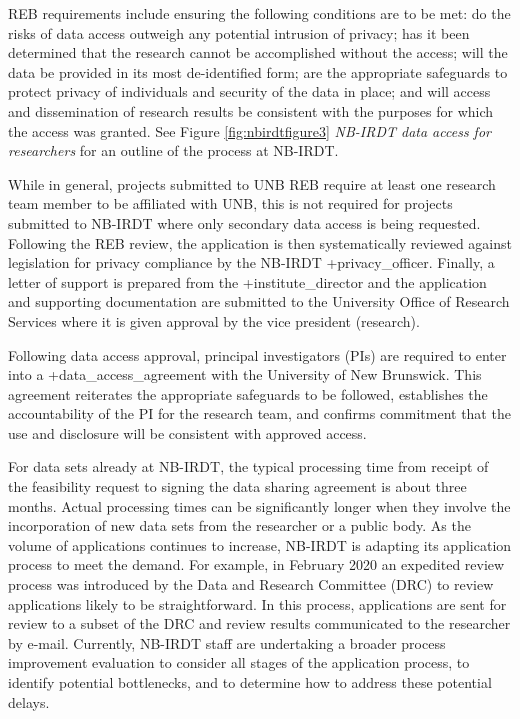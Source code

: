 \documentclass[
]{book}
\begin{document}
REB requirements include ensuring the following conditions are to be met: do the risks of data access outweigh any potential intrusion of privacy; has it been determined that the research cannot be accomplished without the access; will the data be provided in its most de-identified form; are the appropriate safeguards to protect privacy of individuals and security of the data in place; and will access and dissemination of research results be consistent with the purposes for which the access was granted. See Figure \ref{fig:nbirdtfigure3} \emph{NB-IRDT data access for researchers} for an outline of the process at NB-IRDT.

While in general, projects submitted to UNB REB require at least one research team member to be affiliated with UNB, this is not required for projects submitted to NB-IRDT where only secondary data access is being requested. Following the REB review, the application is then systematically reviewed against legislation for privacy compliance by the NB-IRDT +privacy\_officer\textbar. Finally, a letter of support is prepared from the +institute\_director\textbar{} and the application and supporting documentation are submitted to the University Office of Research Services where it is given approval by the vice president (research).

Following data access approval, principal investigators (PIs) are required to enter into a +data\_access\_agreement\textbar{} with the University of New Brunswick. This agreement reiterates the appropriate safeguards to be followed, establishes the accountability of the PI for the research team, and confirms commitment that the use and disclosure will be consistent with approved access.

For data sets already at NB-IRDT, the typical processing time from receipt of the feasibility request to signing the data sharing agreement is about three months. Actual processing times can be significantly longer when they involve the incorporation of new data sets from the researcher or a public body. As the volume of applications continues to increase, NB-IRDT is adapting its application process to meet the demand. For example, in February 2020 an expedited review process was introduced by the Data and Research Committee (DRC) to review applications likely to be straightforward. In this process, applications are sent for review to a subset of the DRC and review results communicated to the researcher by e-mail. Currently, NB-IRDT staff are undertaking a broader process improvement evaluation to consider all stages of the application process, to identify potential bottlenecks, and to determine how to address these potential delays.
\end{document}
